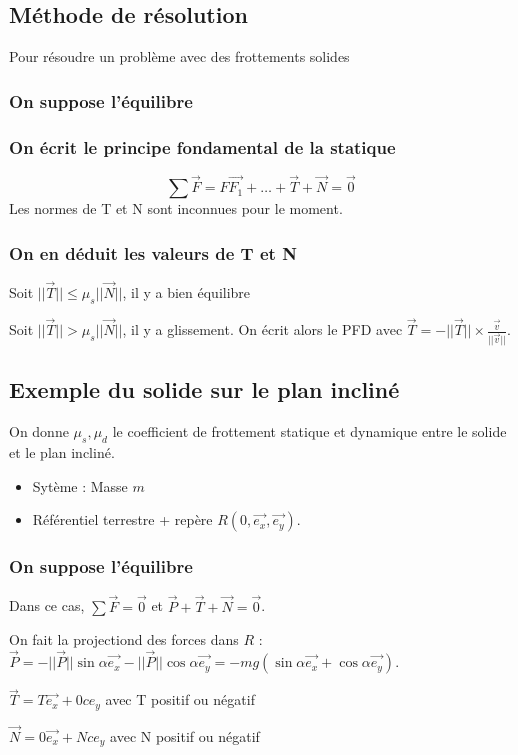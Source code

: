 \documentclass[french]{yLectureNote}
\renewcommand{\vec}{\overrightarrow}
\newcommand{\norm}[1]{||\vec{#1}||}
\begin{document}
\subsection{Méthode de résolution}

Pour résoudre un problème avec des frottements solides
\subsubsection{On suppose l'équilibre}
\subsubsection{On écrit le principe fondamental de la statique}
\[\sum \vec{F} = F\vec{F_1}+\dots +\vec{T}+\vec{N} = \vec{0}\]
Les normes de T et N sont inconnues pour le moment.
\subsubsection{On en déduit les valeurs de T et N}
Soit $\norm{T} \leq \mu_s\norm{N}$, il y a bien équilibre

Soit $\norm{T} > \mu_s\norm{N}$, il y a glissement. On écrit alors le PFD avec $\vec{T} = -\norm{T}\times \frac{\vec{v}}{\norm{v}}$.
\subsection{Exemple du solide sur le plan incliné}
On donne $\mu_s, \mu_d$ le coefficient de frottement statique et dynamique entre le solide et le plan incliné.

\begin{itemize}
 \item Sytème : {Masse $m$}
 \item Référentiel terrestre + repère $R(0,\vec{e_x},\vec{e_y})$.
\end{itemize}
\subsubsection{On suppose l'équilibre}
Dans ce cas, $\sum\vec{F} = \vec{0}$ et $\vec{P}+\vec{T}+\vec{N} = \vec{0}$.

On fait la projectiond des forces dans $R$ :
$\vec{P} = -\norm{P}\sin\alpha \vec{e_x} - \norm{P}\cos\alpha\vec{e_y} = -mg(\sin\alpha \vec{e_x} + \cos\alpha\vec{e_y}) $.

$\vec{T} = T \vec{e_x} + 0 c{e_y} $ avec T positif ou négatif

$\vec{N} = 0 \vec{e_x} + N c{e_y} $ avec N positif ou négatif
\end{document}
